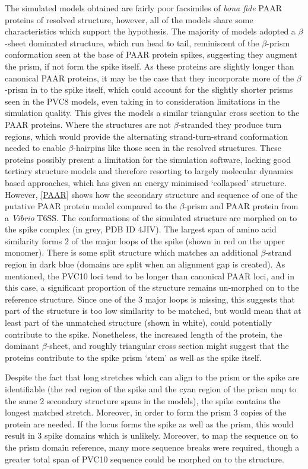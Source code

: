 The simulated models obtained are fairly poor facsimiles of \emph{bona fide} PAAR proteins of resolved structure, however, all of the models share some characteristics which support the hypothesis. The majority of models adopted a $\beta$-sheet dominated structure, which run head to tail, reminiscent of the $\beta$-prism conformation seen at the base of PAAR protein spikes, suggesting they augment the prism, if not form the spike itself. As these proteins are slightly longer than canonical PAAR proteins, it may be the case that they incorporate more of the $\beta$-prism in to the spike itself, which could account for the slightly shorter prisms seen in the PVC8 models, even taking in to consideration limitations in the simulation quality. This gives the models a similar triangular cross section to the PAAR proteins. Where the structures are not $\beta$-stranded they produce turn regions, which would provide the alternating strand-turn-strand conformation needed to enable $\beta$-hairpins like those seen in the resolved structures. These proteins possibly present a limitation for the simulation software, lacking good tertiary structure models and therefore resorting to largely molecular dynamics based approaches, which has given an energy minimised `collapsed' structure. However, \vref{PAAR} shows how the secondary structure and sequence of one of the putative PAAR protein model compared to the $\beta$-prism and PAAR protein from a \emph{Vibrio} T6SS. The conformations of the simulated structure are morphed on to the spike complex (in grey, PDB ID 4JIV). The largest span of amino acid similarity forms 2 of the major loops of the spike (shown in red on the upper monomer). There is some split structure which matches an additional $\beta$-strand region in dark blue (domains are split when an alignment gap is created). As mentioned, the PVC10 loci tend to be longer than canonical PAAR loci, and in this case, a significant proportion of the structure remains un-morphed on to the reference structure. Since one of the 3 major loops is missing, this suggests that part of the structure is too low similarity to be matched, but would mean that at least part of the unmatched structure (shown in white), could potentially contribute to the spike. Nonetheless, the increased length of the protein, the dominant $\beta$-sheet, and roughly triangular cross section might suggest that the proteins contribute to the spike prism `stem' as well as the spike itself.

Despite the fact that long stretches which can align to the prism or the spike are identifiable (the red region of the spike and the cyan region of the prism map to the same 2 secondary structure spans in the models), the spike contains the longest matched stretch. Moreover, in order to form the prism 3 copies of the protein are needed. If the locus forms the spike as well as the prism, this would result in 3 spike domains which is unlikely. Moreover, to map the sequence on to the prism domain reference, many more sequence breaks were required, though a greater total span of PVC10 sequence could be morphed on to the structure.


